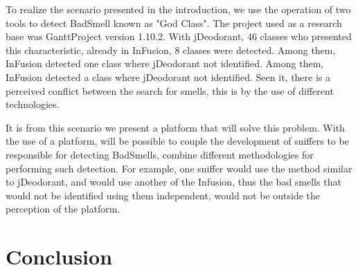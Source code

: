 \documentclass[conference]{IEEEtran}
\begin{document}
To realize the scenario presented in the introduction, we use the operation of two tools to detect 
BadSmell known as "God Class". The project used as a research base was GanttProject version 1.10.2.
With jDeodorant, 46 classes who presented this characteristic, already in InFusion, 8 classes were 
detected. Among them, InFusion detected one class where jDeodorant not identified. Among them, 
InFusion detected a class where jDeodorant not identified. Seen it, there is a perceived conflict 
between the search for smells, this is by the use of different technologies.

It is from this scenario we present a platform that will solve this problem. With the use of a 
platform, will be possible to couple the development of sniffers to be responsible for detecting
BadSmells, combine different methodologies for performing such detection.  For example, one sniffer
would use the method similar to jDeodorant, and would use another of the Infusion, thus the bad 
smells that would not be identified using them independent, would not be outside the perception of
the platform.



\section{Conclusion}
\label{sec:conclusion}





\end{document}
